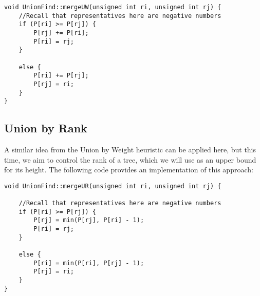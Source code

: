 \begin{verbatim}
void UnionFind::mergeUW(unsigned int ri, unsigned int rj) {
    //Recall that representatives here are negative numbers
    if (P[ri] >= P[rj]) {
        P[rj] += P[ri];
        P[ri] = rj;
    }

    else {
        P[ri] += P[rj];
        P[rj] = ri;
    }
}
\end{verbatim}

\subsection{Union by Rank}
A similar idea from the Union by Weight heuristic can be applied here, but this time, we aim to control the rank of a tree, which we will use as an upper bound for its height. The following code provides an implementation of this approach:

\begin{verbatim}
void UnionFind::mergeUR(unsigned int ri, unsigned int rj) {

    //Recall that representatives here are negative numbers
    if (P[ri] >= P[rj]) {
        P[rj] = min(P[rj], P[ri] - 1);
        P[ri] = rj;
    }

    else {
        P[ri] = min(P[ri], P[rj] - 1);
        P[rj] = ri;
    }
}
\end{verbatim}
